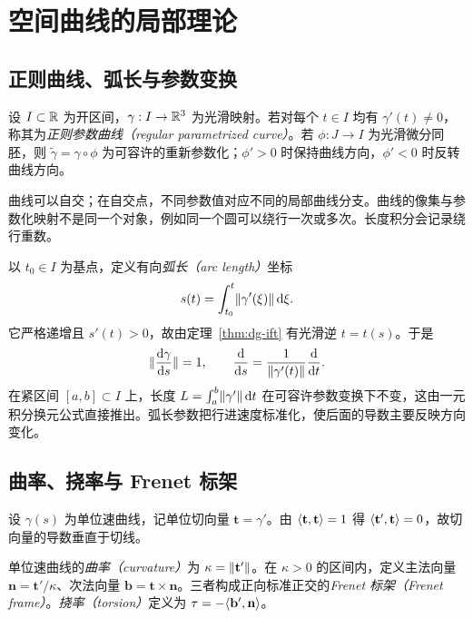 \setcounter{chapter}{1} %
\chapter{空间曲线的局部理论}
\label{chap:dg-curves}

\section{正则曲线、弧长与参数变换}
\begin{definition}[正则参数曲线]
设 $I\subset\mathbb R$ 为开区间，$\gamma:I\to\mathbb R^3$ 为光滑映射。若对每个 $t\in I$ 均有 $\gamma'(t)\ne0$，称其为\emph{正则参数曲线（regular parametrized curve）}。若 $\phi:J\to I$ 为光滑微分同胚，则 $\widetilde\gamma=\gamma\circ\phi$ 为可容许的重新参数化；$\phi'>0$ 时保持曲线方向，$\phi'<0$ 时反转曲线方向。
\end{definition}
曲线可以自交；在自交点，不同参数值对应不同的局部曲线分支。曲线的像集与参数化映射不是同一个对象，例如同一个圆可以绕行一次或多次。长度积分会记录绕行重数。

以 $t_0\in I$ 为基点，定义有向\emph{弧长（arc length）}坐标
\[
 s(t)=\int_{t_0}^t\lVert \gamma'(\xi)\rVert\mathop{}\!\mathrm d\xi.
\]
它严格递增且 $s'(t)>0$，故由定理~\ref{thm:dg-ift} 有光滑逆 $t=t(s)$。于是
\begin{equation}
 \lVert \frac{\mathop{}\!\mathrm d\gamma}{\mathop{}\!\mathrm d s}\rVert=1,
 \qquad \frac{\mathop{}\!\mathrm d}{\mathop{}\!\mathrm d s}=\frac1{\lVert \gamma'(t)\rVert}\frac{\mathop{}\!\mathrm d}{\mathop{}\!\mathrm d t}.
 \label{eq:dg-arclength}
\end{equation}
在紧区间 $[a,b]\subset I$ 上，长度 $L=\int_a^b\lVert \gamma'\rVert\mathop{}\!\mathrm d t$ 在可容许参数变换下不变，这由一元积分换元公式直接推出。弧长参数把行进速度标准化，使后面的导数主要反映方向变化。

\section{曲率、挠率与 Frenet 标架}
设 $\gamma(s)$ 为单位速曲线，记单位切向量 $\mathbf t=\gamma'$。由 $\langle \mathbf t,\mathbf t\rangle=1$ 得 $\langle \mathbf t',\mathbf t\rangle=0$，故切向量的导数垂直于切线。
\begin{definition}
单位速曲线的\emph{曲率（curvature）}为 $\kappa=\lVert \mathbf t'\rVert$。在 $\kappa>0$ 的区间内，定义主法向量 $\mathbf n=\mathbf t'/\kappa$、次法向量 $\mathbf b=\mathbf t\times\mathbf n$。三者构成正向标准正交的\emph{Frenet 标架（Frenet frame）}。\emph{挠率（torsion）}定义为 $\tau=-\langle \mathbf b',\mathbf n\rangle$。
\end{definition}

